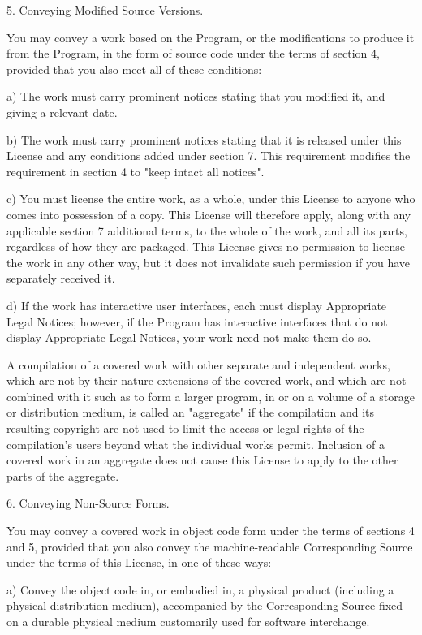 \documentclass[11pt]{book}
\begin{document}
    5. Conveying Modified Source Versions.

    You may convey a work based on the Program, or the modifications to
    produce it from the Program, in the form of source code under the
    terms of section 4, provided that you also meet all of these conditions:

    a) The work must carry prominent notices stating that you modified
    it, and giving a relevant date.

    b) The work must carry prominent notices stating that it is
    released under this License and any conditions added under section
    7.  This requirement modifies the requirement in section 4 to
    "keep intact all notices".

    c) You must license the entire work, as a whole, under this
    License to anyone who comes into possession of a copy.  This
    License will therefore apply, along with any applicable section 7
    additional terms, to the whole of the work, and all its parts,
    regardless of how they are packaged.  This License gives no
    permission to license the work in any other way, but it does not
    invalidate such permission if you have separately received it.

    d) If the work has interactive user interfaces, each must display
    Appropriate Legal Notices; however, if the Program has interactive
    interfaces that do not display Appropriate Legal Notices, your
    work need not make them do so.

    A compilation of a covered work with other separate and independent
    works, which are not by their nature extensions of the covered work,
    and which are not combined with it such as to form a larger program,
    in or on a volume of a storage or distribution medium, is called an
    "aggregate" if the compilation and its resulting copyright are not
    used to limit the access or legal rights of the compilation's users
    beyond what the individual works permit.  Inclusion of a covered work
    in an aggregate does not cause this License to apply to the other
    parts of the aggregate.

    6. Conveying Non-Source Forms.

    You may convey a covered work in object code form under the terms
    of sections 4 and 5, provided that you also convey the
    machine-readable Corresponding Source under the terms of this License,
    in one of these ways:

    a) Convey the object code in, or embodied in, a physical product
    (including a physical distribution medium), accompanied by the
    Corresponding Source fixed on a durable physical medium
    customarily used for software interchange.
\end{document}
